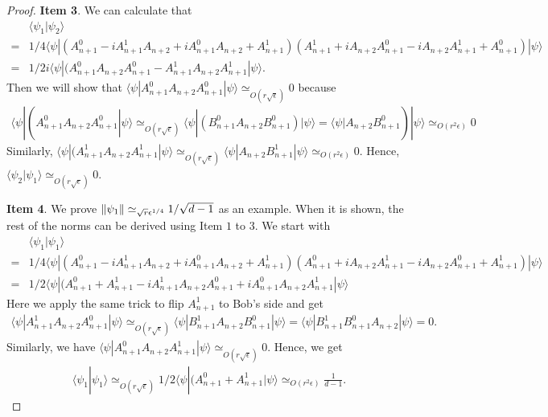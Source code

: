 \documentclass[11pt,letterpaper]{article}
\newcommand{\ket}[1]{|#1\rangle}
\newcommand{\bra}[1]{\langle#1|}
\newcommand{\braket}[2]{\langle#1|#2\rangle}
\DeclarePairedDelimiter{\norm}{\lVert}{\rVert}
\newcommand{\1}{\mathbb{1}}
\newcommand{\ep}{\epsilon}
\newcommand{\se}{\sqrt{\epsilon}}
\newcommand{\qe}{\epsilon^{1/4}}
\newcommand{\appd}[1]{\simeq_{#1}}
\theoremstyle{definition}
\begin{document}
\begin{proof}
	\textbf{Item 3}. We can calculate that 
	\begin{align*}
		&\braket{\psi_1}{\psi_2}\\
	 = &1/4\bra{\psi}(A_{n+1}^0 - iA_{n+1}^1A_{n+2} + iA_{n+1}^0A_{n+2} +A_{n+1}^1)(A_{n+1}^1 + iA_{n+2}A_{n+1}^0 -iA_{n+2}A_{n+1}^1 + A_{n+1}^0)\ket{\psi}\\
	 =& 1/2i \bra{\psi}(A_{n+1}^0A_{n+2}A_{n+1}^0-A_{n+1}^1A_{n+2}A_{n+1}^1\ket{\psi}.
	\end{align*}
	Then we will show that $\bra{\psi} A_{n+1}^0A_{n+2}A_{n+1}^0 \ket{\psi} \appd{O( r\se)} 0$ because
	\begin{align}
	 \bra{\psi}(A_{n+1}^0A_{n+2}A_{n+1}^0\ket{\psi} \appd{O(r\se)}  \bra{\psi}(B_{n+1}^0A_{n+2}B_{n+1}^0)\ket{\psi} =\bra{\psi}A_{n+2}B_{n+1}^0)\ket{\psi}
	\appd{O(r^2\ep)} 0
	\end{align}
	Similarly, $\bra{\psi}(A_{n+1}^1A_{n+2}A_{n+1}^1\ket{\psi} \appd{O(r\se)} \bra{\psi} A_{n+2}B_{n+1}^1 \ket{\psi} \appd{O(r^2\ep)} 0$.
	Hence, $\braket{\psi_2}{\psi_1} \appd{O(r\se)} 0$.
	
	\textbf{Item 4}. We prove $\norm{\psi_1} \appd{\sqrt{r} \qe} 1/\sqrt{d-1}$ as an example. When it is shown,
	the rest of the norms can be derived using Item $1$ to $3$.
	We start with
	\begin{align*}
		&\braket{\psi_1}{\psi_1} \\
		=&1/4\bra{\psi}(A_{n+1}^0 - iA_{n+1}^1A_{n+2} + iA_{n+1}^0A_{n+2} +A_{n+1}^1)(A_{n+1}^0 + iA_{n+2}A_{n+1}^1 -iA_{n+2}A_{n+1}^0 + A_{n+1}^1)\ket{\psi}\\
		=&1/2\bra{\psi}(A_{n+1}^0+A_{n+1}^1-iA_{n+1}^1A_{n+2}A_{n+1}^0+iA_{n+1}^0A_{n+2}A_{n+1}^1\ket{\psi}
	\end{align*}
	Here we apply the same trick to flip $A_{n+1}^1$ to Bob's side and get 
	\begin{align}
		\bra{\psi}A_{n+1}^1A_{n+2}A_{n+1}^0\ket{\psi} \appd{O(r\se)} \bra{\psi}B_{n+1}^1A_{n+2}B_{n+1}^0\ket{\psi} 
		= \bra{\psi}B_{n+1}^1B_{n+1}^0A_{n+2}\ket{\psi} = 0.
	\end{align}
	Similarly, we have $\bra{\psi}A_{n+1}^0A_{n+2}A_{n+1}^1\ket{\psi} \appd{ O(r\se)} 0$.
	Hence, we get 
	\begin{align}
		\braket{\psi_1}{\psi_1} \appd{O(r\se)} 1/2\bra{\psi}(A_{n+1}^0+A_{n+1}^1\ket{\psi} \appd{O(r^2\ep)} 
		 \frac{1}{d-1}.
	\end{align}
	

\end{proof}
\end{document}
